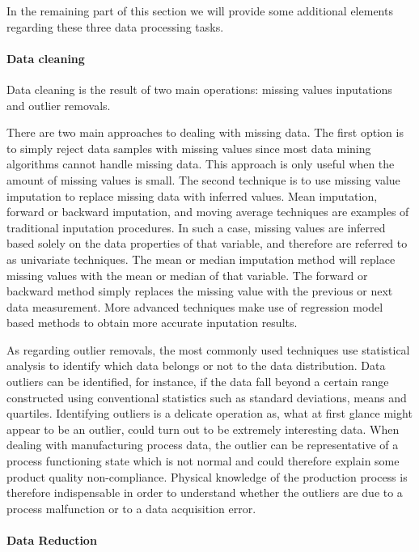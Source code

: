 In the remaining part of this section we will provide some additional elements regarding these three data processing tasks. 
  
\paragraph{Data cleaning}


Data cleaning is the result of two main operations: missing values inputations and outlier removals.

There are two main approaches to dealing with missing data. The first option is to simply reject data samples with missing values since most data mining algorithms cannot handle missing data. This approach is only useful when the amount of missing values is small. The second technique is to use missing value imputation to replace missing data with inferred values. Mean imputation, forward or backward imputation, and moving average techniques are examples of traditional inputation procedures. In such a case, missing values are inferred based solely on the data properties of that variable, and therefore are referred to as univariate techniques. The mean or median imputation method will replace missing values with the mean or median of that variable. The forward or backward method simply replaces the missing value with the previous or next data measurement. More advanced techniques make use of regression model based methods to obtain more accurate inputation results. 

As regarding outlier removals, the most commonly used techniques use statistical analysis to identify which data belongs or not to the data distribution. Data outliers can be identified, for instance, if the data fall beyond a certain range constructed using conventional statistics such as standard deviations, means and quartiles. Identifying outliers is a delicate operation as, what at first glance might appear to be an outlier, could turn out to be extremely interesting data. When dealing with manufacturing process data, the outlier can be representative of a process functioning state which is not normal and could therefore explain some product quality non-compliance. Physical knowledge of the production process is therefore indispensable in order to understand whether the outliers are due to a process malfunction or to a data acquisition error.    


\paragraph{Data Reduction}

